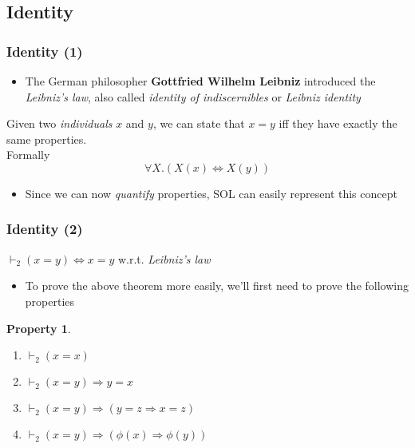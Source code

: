 \documentclass{beamer}
\newtheorem{property}{Property}
\begin{document}
            \subsection{Identity}
                \begin{frame}
                    \frametitle{Identity (1)}
                    \begin{itemize}
                        \item The German philosopher \textbf{Gottfried Wilhelm Leibniz} introduced the \textit{Leibniz's law}, also called \textit{identity of indiscernibles} or \textit{Leibniz identity}
                    \end{itemize}
                    \begin{definition}
                        Given two \textit{individuals} $ x $ and $ y $, we can state that $ x = y $ iff they have exactly the same properties.\\
                        Formally
                        \[
                            \forall X. (X(x) \Leftrightarrow X(y))    
                        \] 
                    \end{definition}
                    \begin{itemize}
                        \item Since we can now \textit{quantify} properties, SOL can easily represent this concept
                    \end{itemize}
                \end{frame}

                \begin{frame}
                    \frametitle{Identity (2)}
                    \begin{theorem}
                        $ \vdash_2 (x = y) \Leftrightarrow x = y $ w.r.t. \textit{Leibniz's law}
                    \end{theorem}
                    \begin{itemize}
                        \item To prove the above theorem more easily, we'll first need to prove the following properties
                    \end{itemize}
                    \begin{property}
                        \begin{enumerate}
                            \item[$ I_{\,1} $] $ \vdash_2 (x = x) $
                            \item[$ I_{\,2} $] $ \vdash_2 (x = y) \Rightarrow y = x $
                            \item[$ I_{\,3} $] $ \vdash_2 (x = y) \Rightarrow (y = z \Rightarrow x = z) $
                            \item[$ I_{\,4} $] $ \vdash_2 (x = y) \Rightarrow (\phi(x) \Rightarrow \phi(y)) $
                        \end{enumerate}
                    \end{property}
                \end{frame}
\end{document}
